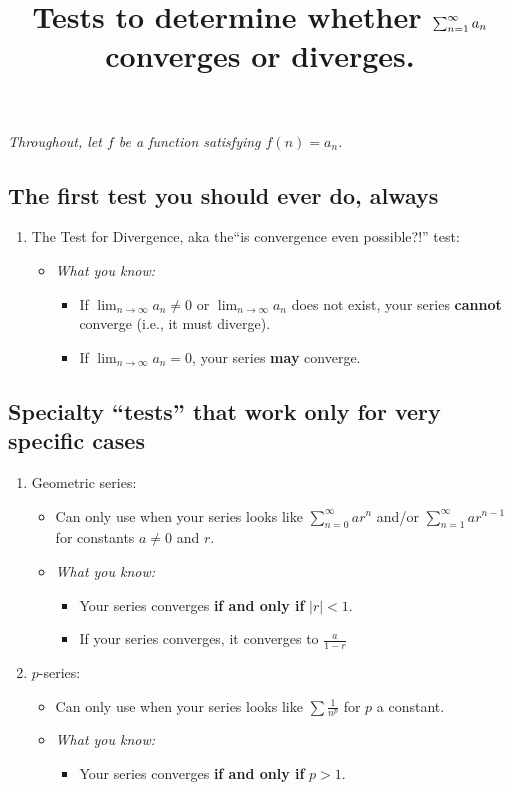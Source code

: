 \documentclass[12pt]{article}
\title{\vspace{-0.75in}\Large{Tests to determine whether $\ser$ converges or diverges.}\vspace{-0.75in}}
\date{}
\newcommand{\shortlim}{\lim_{n\to\infty}}
\newcommand{\infsum}[3]{\sum_{{#1}={#2}}^\infty {#3}}
\begin{document}
	\maketitle
	\vspace{-0.25in}
	\begin{center}
	\textit{Throughout, let $f$ be a function satisfying $f(n)=a_n$.}
	\end{center}
	\subsection*{The first test you should ever do, always}
	\begin{enumerate}
		\item[] \hspace{-0.25in}The Test for Divergence, aka the``is convergence even possible?!'' test:
		\begin{itemize}
			\item \textit{What you know:} 
			\begin{itemize}
				\item If $\shortlim{a_n}\neq 0$ or $\shortlim{a_n}$ does not exist, your series \textbf{cannot} converge (i.e., it must diverge).
				\item If $\shortlim{a_n}=0$, your series \textbf{may} converge.
			\end{itemize}
		\end{itemize}
	\end{enumerate}
	
	\subsection*{Specialty ``tests'' that work only for very specific cases}
	\begin{enumerate}
		\item Geometric series:
		\begin{itemize}
			\item Can only use when your series looks like $\infsum{n}{0}ar^n$ and/or $\infsum{n}{1}ar^{n-1}$ for constants $a\neq0$  and $r$.
			\item \textit{What you know:} 
			\begin{itemize}
				\item Your series converges \textbf{if and only if} $|r|<1$.
				\item If your series converges, it converges to $\frac{a}{1-r}$
			\end{itemize}
		\end{itemize}
	
		\item $p$-series:
		\begin{itemize}
			\item Can only use when your series looks like $\sum{\frac{1}{n^p}}$ for $p$ a constant.
			\item \textit{What you know:} 
			\begin{itemize}
				\item Your series converges \textbf{if and only if} $p>1$.
			\end{itemize}
		\end{itemize}
	\end{enumerate}
	
\end{document}
